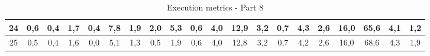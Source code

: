 \begin{sidewaystable}[]
\begin{tabular}{|c|c|c|c|c|c|c|c|c|c|c|c|c|c|c|c|c|c|c|c|}
    24 & 0,6                                             & 0,4                                             & 1,7                                             & 0,4                                             & 7,8                                              & 1,9                                              & 2,0                                              & 5,3                                              & 0,6                                              & 4,0                                              & 12,9                                             & 3,2                                              & 0,7                                              & 4,3                                              & 2,6                                              & 16,0                                             & 65,6                                             & 4,1                                              & 1,2                                              \\ \hline
    25 & 0,5                                             & 0,4                                             & 1,6                                             & 0,0                                             & 5,1                                              & 1,3                                              & 0,5                                              & 1,9                                              & 0,6                                              & 4,0                                              & 12,8                                             & 3,2                                              & 0,7                                              & 4,2                                              & 2,6                                              & 16,0                                             & 68,6                                             & 4,3                                              & 1,9                                              \\ \hline
    \end{tabular}
    \caption{Execution metrics - Part 8}
    \label{tab:ap:exec_metrics_8}
\end{sidewaystable}

